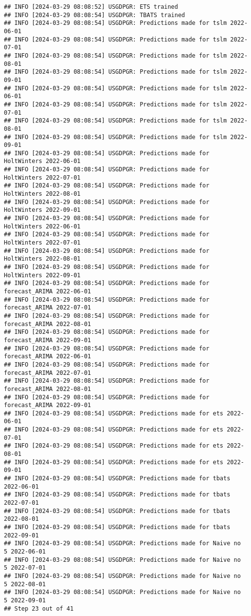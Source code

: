 \documentclass[
]{article}
\begin{document}
\begin{verbatim}
## INFO [2024-03-29 08:08:52] USGDPGR: ETS trained
## INFO [2024-03-29 08:08:54] USGDPGR: TBATS trained
## INFO [2024-03-29 08:08:54] USGDPGR: Predictions made for tslm 2022-06-01
## INFO [2024-03-29 08:08:54] USGDPGR: Predictions made for tslm 2022-07-01
## INFO [2024-03-29 08:08:54] USGDPGR: Predictions made for tslm 2022-08-01
## INFO [2024-03-29 08:08:54] USGDPGR: Predictions made for tslm 2022-09-01
## INFO [2024-03-29 08:08:54] USGDPGR: Predictions made for tslm 2022-06-01
## INFO [2024-03-29 08:08:54] USGDPGR: Predictions made for tslm 2022-07-01
## INFO [2024-03-29 08:08:54] USGDPGR: Predictions made for tslm 2022-08-01
## INFO [2024-03-29 08:08:54] USGDPGR: Predictions made for tslm 2022-09-01
## INFO [2024-03-29 08:08:54] USGDPGR: Predictions made for HoltWinters 2022-06-01
## INFO [2024-03-29 08:08:54] USGDPGR: Predictions made for HoltWinters 2022-07-01
## INFO [2024-03-29 08:08:54] USGDPGR: Predictions made for HoltWinters 2022-08-01
## INFO [2024-03-29 08:08:54] USGDPGR: Predictions made for HoltWinters 2022-09-01
## INFO [2024-03-29 08:08:54] USGDPGR: Predictions made for HoltWinters 2022-06-01
## INFO [2024-03-29 08:08:54] USGDPGR: Predictions made for HoltWinters 2022-07-01
## INFO [2024-03-29 08:08:54] USGDPGR: Predictions made for HoltWinters 2022-08-01
## INFO [2024-03-29 08:08:54] USGDPGR: Predictions made for HoltWinters 2022-09-01
## INFO [2024-03-29 08:08:54] USGDPGR: Predictions made for forecast_ARIMA 2022-06-01
## INFO [2024-03-29 08:08:54] USGDPGR: Predictions made for forecast_ARIMA 2022-07-01
## INFO [2024-03-29 08:08:54] USGDPGR: Predictions made for forecast_ARIMA 2022-08-01
## INFO [2024-03-29 08:08:54] USGDPGR: Predictions made for forecast_ARIMA 2022-09-01
## INFO [2024-03-29 08:08:54] USGDPGR: Predictions made for forecast_ARIMA 2022-06-01
## INFO [2024-03-29 08:08:54] USGDPGR: Predictions made for forecast_ARIMA 2022-07-01
## INFO [2024-03-29 08:08:54] USGDPGR: Predictions made for forecast_ARIMA 2022-08-01
## INFO [2024-03-29 08:08:54] USGDPGR: Predictions made for forecast_ARIMA 2022-09-01
## INFO [2024-03-29 08:08:54] USGDPGR: Predictions made for ets 2022-06-01
## INFO [2024-03-29 08:08:54] USGDPGR: Predictions made for ets 2022-07-01
## INFO [2024-03-29 08:08:54] USGDPGR: Predictions made for ets 2022-08-01
## INFO [2024-03-29 08:08:54] USGDPGR: Predictions made for ets 2022-09-01
## INFO [2024-03-29 08:08:54] USGDPGR: Predictions made for tbats 2022-06-01
## INFO [2024-03-29 08:08:54] USGDPGR: Predictions made for tbats 2022-07-01
## INFO [2024-03-29 08:08:54] USGDPGR: Predictions made for tbats 2022-08-01
## INFO [2024-03-29 08:08:54] USGDPGR: Predictions made for tbats 2022-09-01
## INFO [2024-03-29 08:08:54] USGDPGR: Predictions made for Naive no  5 2022-06-01
## INFO [2024-03-29 08:08:54] USGDPGR: Predictions made for Naive no  5 2022-07-01
## INFO [2024-03-29 08:08:54] USGDPGR: Predictions made for Naive no  5 2022-08-01
## INFO [2024-03-29 08:08:54] USGDPGR: Predictions made for Naive no  5 2022-09-01
## Step 23 out of 41
\end{verbatim}
\end{document}
